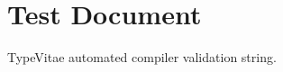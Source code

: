 \documentclass{article}
\begin{document}
\section{Test Document}
TypeVitae automated compiler validation string.
\end{document}
